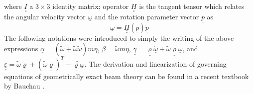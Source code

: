 \documentclass{aiaa-tc}
\newcommand{\tens}[1]{\underline{\underline{#1}}}
\renewcommand{\vec}[1]{\underline{#1}}
\begin{document}
where $\tens{I}$ a $3 \times 3$ identity matrix; operator $\tens{H}$ is the tangent tensor which relates the angular velocity vector $\vec{\omega}$ and the rotation parameter vector $\vec{p}$ as
\begin{equation}
	\label{operatorH}
	\vec{\omega} = \tens{H}(\vec{p}) \dot{\vec{p}}
\end{equation}
The following notations were introduced to simply the writing of the above expressions $\vec{\alpha} = (\dot{\tilde{\omega}} + \tilde{\omega} \tilde{\omega} ) m \vec{\eta}$, $\vec{\beta} = \tilde{\omega} m \vec{\eta}$, $\vec{\gamma} = \tens{\varrho} \dot{\vec{\omega}} + \tilde{\omega} \tens{\varrho} \vec{\omega}$, and $\tens{\varepsilon} = \tilde{\omega} \tens{\varrho} + (\tilde{\omega} \tens{\varrho})^T - \widetilde{\tens{\varrho} \vec{\omega}}$.   
The derivation and linearization of governing equations of geometrically exact beam theory can be found in a recent textbook by Bauchau \cite{Bauchau:2010}.
\end{document}

